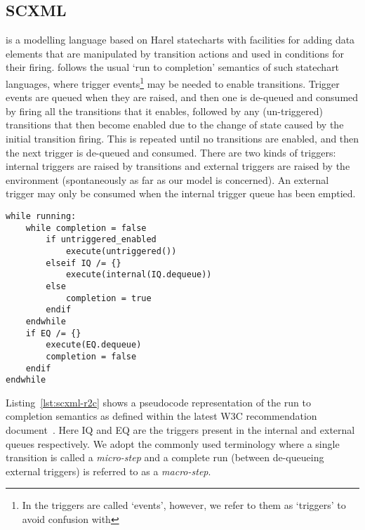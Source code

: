 
\subsection{SCXML}
\label{sec:scxml}

\SCXML is a modelling language based on Harel statecharts with facilities for adding data elements that are manipulated by transition actions and used in conditions for their firing. \SCXML follows the usual `run to completion' semantics of such statechart languages, where trigger events\footnote{In \SCXML the triggers are called `events', however, we refer to them as `triggers' to avoid confusion with \EventB} may be needed to enable transitions. Trigger events are queued when they are raised, and then one is de-queued and consumed by firing all the transitions that it enables, followed by any (un-triggered) transitions that then become enabled due to the change of state caused by the initial transition firing. This is repeated until no transitions are enabled, and then the next trigger is de-queued and consumed. There are two kinds of triggers: internal triggers are raised by transitions and external triggers are raised by the environment (spontaneously as far as our model is concerned). An external trigger may only be consumed when the internal trigger queue has been emptied. 

\begin{lstlisting}[caption=Pseudocode for 'run to completion',label={lst:scxml-r2c}, frame=single]
while running:
	while completion = false
		if untriggered_enabled
			execute(untriggered())
		elseif IQ /= {}
			execute(internal(IQ.dequeue)) 
		else
			completion = true
		endif
	endwhile
	if EQ /= {}
		execute(EQ.dequeue) 
		completion = false
	endif
endwhile 
\end{lstlisting}

Listing~\ref{lst:scxml-r2c} shows a pseudocode representation of the run to completion semantics as defined within the latest W3C recommendation document~\cite{scxmlwebsite}. Here IQ and EQ are the triggers present in the internal and external queues respectively. We adopt the commonly used terminology where a single transition is called a \emph{micro-step} and a complete run (between de-queueing external triggers) is referred to as a \emph{macro-step}.

